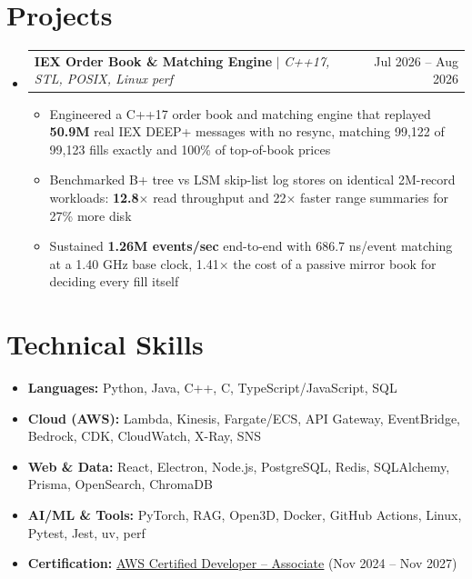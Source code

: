 \documentclass[letterpaper,10pt]{article}
\makeatletter
\newcommand{\resumeItem}[1]{\item{#1}\vspace{-1pt}}
\newcommand{\resumeProjectHeading}[2]{%
  \item
  \begin{tabular*}{\textwidth}{l@{\extracolsep{\fill}}r}
    #1 & #2 \\
  \end{tabular*}\vspace{-6pt}%
}
\newcommand{\resumeSubHeadingListStart}{\begin{itemize}[leftmargin=0in, label={}, itemsep=0pt, topsep=2pt]}
\newcommand{\resumeSubHeadingListEnd}{\end{itemize}}
\newcommand{\resumeItemListStart}{\begin{itemize}[leftmargin=0.18in, itemsep=0pt, topsep=1pt, parsep=0pt]}
\newcommand{\resumeItemListEnd}{\end{itemize}\vspace{0pt}}
\makeatother
\begin{document}
\section{Projects}
\resumeSubHeadingListStart
  \resumeProjectHeading
    {\textbf{IEX Order Book \& Matching Engine} $|$ \textit{C++17, STL, POSIX, Linux perf}}{Jul 2026 -- Aug 2026}
  \resumeItemListStart
    \resumeItem{Engineered a C++17 order book and matching engine that replayed \textbf{50.9M} real IEX DEEP+ messages with no resync, matching 99,122 of 99,123 fills exactly and 100\% of top-of-book prices}
    \resumeItem{Benchmarked B+ tree vs LSM skip-list log stores on identical 2M-record workloads: \textbf{12.8$\times$} read throughput and 22$\times$ faster range summaries for 27\% more disk}
    \resumeItem{Sustained \textbf{1.26M events/sec} end-to-end with 686.7 ns/event matching at a 1.40 GHz base clock, 1.41$\times$ the cost of a passive mirror book for deciding every fill itself}
  \resumeItemListEnd
\resumeSubHeadingListEnd

\section{Technical Skills}
\begin{itemize}[leftmargin=0in, label={}, itemsep=0pt, topsep=2pt]
  \small
  \item{\textbf{Languages:} Python, Java, C++, C, TypeScript/JavaScript, SQL}
  \item{\textbf{Cloud (AWS):} Lambda, Kinesis, Fargate/ECS, API Gateway, EventBridge, Bedrock, CDK, CloudWatch, X-Ray, SNS}
  \item{\textbf{Web \& Data:} React, Electron, Node.js, PostgreSQL, Redis, SQLAlchemy, Prisma, OpenSearch, ChromaDB}
  \item{\textbf{AI/ML \& Tools:} PyTorch, RAG, Open3D, Docker, GitHub Actions, Linux, Pytest, Jest, uv, perf}
  \item{\textbf{Certification:} \href{https://www.credly.com/badges/d2406a97-d937-47de-823b-724981159d3b/public_url}{\underline{AWS Certified Developer -- Associate}} (Nov 2024 -- Nov 2027)}
\end{itemize}
\end{document}

